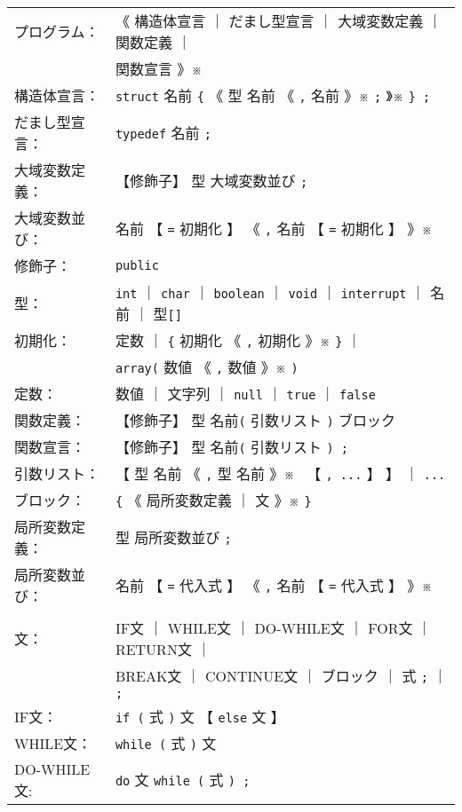 {\small\tt
\begin{tabular}{l l}
プログラム：  & 《 構造体宣言 ｜ だまし型宣言 ｜ 大域変数定義 ｜ 関数定義 ｜\\
              &  関数宣言 》※ \\
構造体宣言：  & \verb+struct+ 名前 \verb+{+
                《 型 名前 《 \verb+,+ 名前 》※ \verb+;+ 》※ \verb+} ;+ \\
だまし型宣言：& \verb+typedef+ 名前 \verb+;+ \\
大域変数定義：& 【修飾子】 型 大域変数並び \verb+;+ \\
大域変数並び：& 名前 【 \verb+=+ 初期化 】
                《 \verb+,+ 名前 【 \verb+=+ 初期化 】 》※ \\
修飾子：      & \verb+public+ \\
型：          & \verb+int+  ｜ \verb+char+ ｜ \verb+boolean+ ｜
                \verb+void+ ｜ \verb+interrupt+ ｜ 名前 ｜ 型\verb+[]+ \\
初期化：      & 定数 ｜ \verb+{+ 初期化 《 \verb+,+ 初期化 》※ \verb+}+ ｜ \\
              & \verb+array(+ 数値 《 \verb+,+ 数値 》※ \verb+)+ \\
定数：        & 数値 ｜ 文字列 ｜ \verb+null+ ｜ \verb+true+ ｜
                \verb+false+ \\
関数定義：    & 【修飾子】 型 名前\verb+(+ 引数リスト \verb+)+ ブロック \\
関数宣言：    & 【修飾子】 型 名前\verb+(+ 引数リスト \verb+) ;+ \\
引数リスト：  & 【 型 名前 《 \verb+,+ 型 名前 》※~
                【 \verb+, ...+ 】 】 ｜ \verb+...+ \\
ブロック：    & \verb+{+ 《 局所変数定義 ｜ 文 》※ \verb+}+ \\
局所変数定義：& 型 局所変数並び \verb+;+ \\
局所変数並び：& 名前 【 \verb+=+ 代入式 】
                《 \verb+,+ 名前 【 \verb+=+ 代入式 】 》※ \\
&\\
文：          & IF文 ｜ WHILE文 ｜ DO-WHILE文 ｜ FOR文 ｜ RETURN文 ｜ \\
              & BREAK文 ｜ CONTINUE文 ｜ ブロック ｜ 式 \verb+;+ ｜ \verb+;+\\
IF文：        & \verb+if (+ 式 \verb+)+ 文  【 \verb+else+ 文  】 \\
WHILE文：     & \verb+while (+ 式 \verb+)+ 文 \\
DO-WHILE文:   & \verb+do+ 文 \verb+while (+ 式 \verb+) ;+ \\

\end{tabular}}
